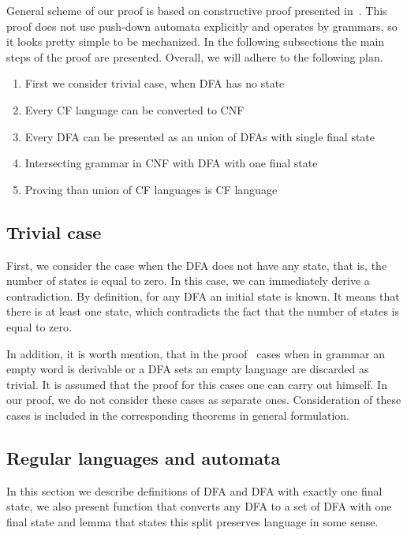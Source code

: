 General scheme of our proof is based on constructive proof presented in~\cite{beigelproof}.
This proof does not use push-down automata explicitly and operates by grammars, so it looks pretty simple to be mechanized.
In the following subsections the main steps of the proof are presented. Overall, we will adhere to the following plan. 

\begin{enumerate}
    \item First we consider trivial case, when DFA has no state
    \item Every CF language can be converted to CNF
    \item Every DFA can be presented as an union of DFAs with single final state
    \item Intersecting grammar in CNF with DFA with one final state
    \item Proving than union of CF languages is CF language
\end{enumerate}

\subsection{Trivial case}

First, we consider the case when the DFA does not have any state, that is, the number of states is equal to zero. 
In this case, we can immediately derive a contradiction.
By definition, for any DFA an initial state is known. 
It means that there is at least one state, which contradicts the fact that the number of states is equal to zero.

In addition, it is worth mention, that in the proof~\cite {beigelproof} cases when in grammar an empty word is derivable or a DFA sets an empty language are discarded as trivial.
It is assumed that the proof for this cases one can carry out himself.
In our proof, we do not consider these cases as separate ones.
Consideration of these cases is included in the corresponding theorems in general formulation.

\subsection{Regular languages and automata}

In this section we describe definitions of DFA and DFA with exactly one final state, we also present function that converts any DFA to a set of DFA with one final state and lemma that states this split preserves language in some sense.


